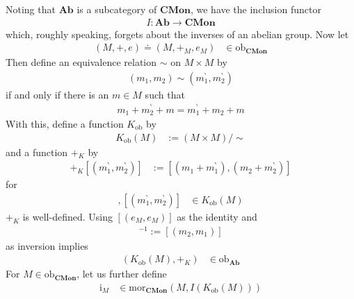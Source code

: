 \begin{exa}
\label{exa:grothengr}
Noting that $\mathbf{Ab}$ is a subcategory of $\mathbf{CMon}$, we have the inclusion functor
\begin{align*}
  I
  \colon
  \mathbf{Ab}
  \rightarrow
  \mathbf{CMon}
\end{align*}
which, roughly speaking, forgets about the inverses of an abelian group.
Now let
\begin{align*}
  (M,+,e)
  \doteq
  (M,+_{M},e_{M})
  &\in
  \mathrm{ob}_{\mathbf{CMon}}
\end{align*}
Then define an equivalence relation $\sim$ on $M \times M$ by
\begin{align*}
  (m_{1},m_{2})
  \sim
  (m_{1}^{\backprime},m_{2}^{\backprime})
\end{align*}
if and only if there is an $m \in M$ such that
\begin{align*}
  m_{1}
  +
  m_{2}^{\backprime}
  +
  m
  =
  m_{1}^{\backprime}
  +
  m_{2}
  +
  m
\end{align*}
With this, define a function $K_{\mathrm{ob}}$ by
\begin{align*}
  K_{\mathrm{ob}}(M) 
  &:=
  (M \times M)
  \slash
  \sim
\end{align*}
and a function $+_{K}$ by
\begin{align*}
  [(m_{1},m_{2})]
  +_{K}
  \left[
    (m_{1}^{\backprime},m_{2}^{\backprime})
  \right]
  &:=
  \left[
    \left(
      m_{1}
      +
      m_{1}^{\backprime}
    \right),
    \left(
      m_{2}
      +
      m_{2}^{\backprime}
    \right)
  \right]
\end{align*}
for
\begin{align*}
  [(m_{1},m_{2})],
  \left[
    (m_{1}^{\backprime},m_{2}^{\backprime})
  \right]
  &\in
  K_{\mathrm{ob}}(M)
\end{align*}
$+_{K}$ is well-defined.
Using $[(e_{M},e_{M})]$ as the identity and
\begin{align*}
  [(m_{1},m_{2})]^{-1}
  :=
  [(m_{2},m_{1})]
\end{align*}
as inversion implies
\begin{align*}
  \left(
    K_{\mathrm{ob}}(M),
    +_{K}
  \right)
  &\in
  \mathrm{ob}_{\mathbf{Ab}}
\end{align*}
For $M \in \mathrm{ob}_{\mathbf{CMon}}$, let us further define
\begin{align*}
  \mathrm{i}_{M}
  &\in
  \mathrm{mor}_{\mathbf{CMon}}
  \left(
    M,
    I(K_{\textrm{ob}}(M))
  \right)
\end{align*}

\end{exa}
